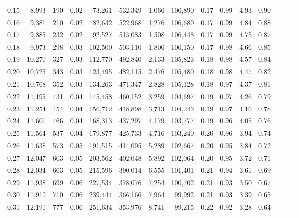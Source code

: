 \begin{tabular}{rrrrrrrrrrrrrrr}
0.15 &   8,993 &    190 &  0.02 &   73,261 &  532,349 &    1,066 &  106,890 &  0.17 &  0.99 &  4.93 &      0.90 \\
0.16 &   9,381 &    210 &  0.02 &   82,642 &  522,968 &    1,276 &  106,680 &  0.17 &  0.99 &  4.84 &      0.88 \\
0.17 &   9,885 &    232 &  0.02 &   92,527 &  513,083 &    1,508 &  106,448 &  0.17 &  0.99 &  4.75 &      0.87 \\
0.18 &   9,973 &    298 &  0.03 &  102,500 &  503,110 &    1,806 &  106,150 &  0.17 &  0.98 &  4.66 &      0.85 \\
0.19 &  10,270 &    327 &  0.03 &  112,770 &  492,840 &    2,133 &  105,823 &  0.18 &  0.98 &  4.57 &      0.84 \\
0.20 &  10,725 &    343 &  0.03 &  123,495 &  482,115 &    2,476 &  105,480 &  0.18 &  0.98 &  4.47 &      0.82 \\
0.21 &  10,768 &    352 &  0.03 &  134,263 &  471,347 &    2,828 &  105,128 &  0.18 &  0.97 &  4.37 &      0.81 \\
0.22 &  11,195 &    431 &  0.04 &  145,458 &  460,152 &    3,259 &  104,697 &  0.19 &  0.97 &  4.26 &      0.79 \\
0.23 &  11,254 &    454 &  0.04 &  156,712 &  448,898 &    3,713 &  104,243 &  0.19 &  0.97 &  4.16 &      0.78 \\
0.24 &  11,601 &    466 &  0.04 &  168,313 &  437,297 &    4,179 &  103,777 &  0.19 &  0.96 &  4.05 &      0.76 \\
0.25 &  11,564 &    537 &  0.04 &  179,877 &  425,733 &    4,716 &  103,240 &  0.20 &  0.96 &  3.94 &      0.74 \\
0.26 &  11,638 &    573 &  0.05 &  191,515 &  414,095 &    5,289 &  102,667 &  0.20 &  0.95 &  3.84 &      0.72 \\
0.27 &  12,047 &    603 &  0.05 &  203,562 &  402,048 &    5,892 &  102,064 &  0.20 &  0.95 &  3.72 &      0.71 \\
0.28 &  12,034 &    663 &  0.05 &  215,596 &  390,014 &    6,555 &  101,401 &  0.21 &  0.94 &  3.61 &      0.69 \\
0.29 &  11,938 &    699 &  0.06 &  227,534 &  378,076 &    7,254 &  100,702 &  0.21 &  0.93 &  3.50 &      0.67 \\
0.30 &  11,910 &    710 &  0.06 &  239,444 &  366,166 &    7,964 &   99,992 &  0.21 &  0.93 &  3.39 &      0.65 \\
0.31 &  12,190 &    777 &  0.06 &  251,634 &  353,976 &    8,741 &   99,215 &  0.22 &  0.92 &  3.28 &      0.64 \\

\end{tabular}
